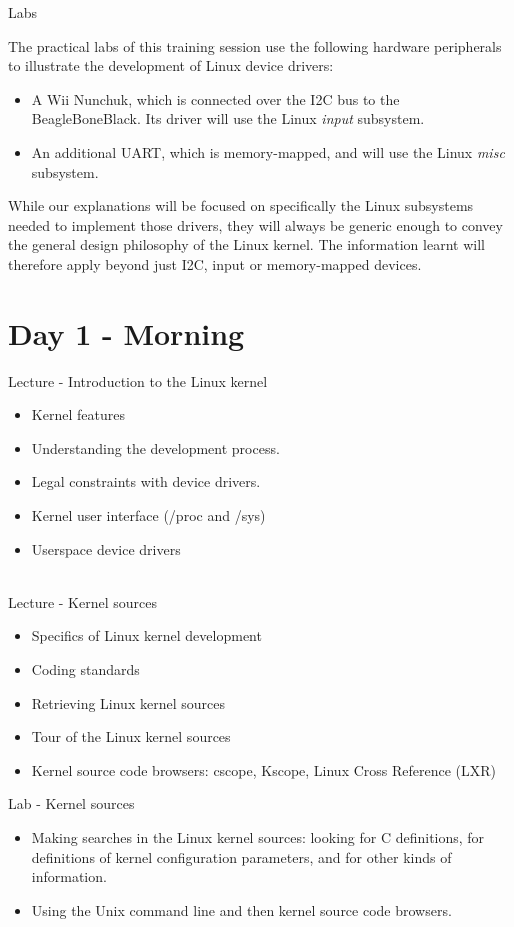 \documentclass[a4paper,12pt,obeyspaces,spaces,hyphens]{article}
\begin{document}
\feagendaonecolumn
{Labs}
{
  The practical labs of this training session use the following
  hardware peripherals to illustrate the development of Linux device
  drivers:

  \begin{itemize}
  \item A Wii Nunchuk, which is connected over the I2C bus to the
    BeagleBoneBlack. Its driver will use the Linux {\em input}
    subsystem.
  \item An additional UART, which is memory-mapped, and will use the
    Linux {\em misc} subsystem.
  \end{itemize}

  While our explanations will be focused on specifically the Linux
  subsystems needed to implement those drivers, they will always be
  generic enough to convey the general design philosophy of the Linux
  kernel. The information learnt will therefore apply beyond just
  I2C, input or memory-mapped devices.
}


\section{Day 1 - Morning}

\feagendaonecolumn
{Lecture - Introduction to the Linux kernel}
{
  \begin{itemize}
  \item Kernel features
  \item Understanding the development process.
  \item Legal constraints with device drivers.
  \item Kernel user interface (/proc and /sys)
  \item Userspace device drivers
  \end{itemize}
}
\\
\feagendatwocolumn
{Lecture - Kernel sources}
{
  \begin{itemize}
  \item Specifics of Linux kernel development
  \item Coding standards
  \item Retrieving Linux kernel sources
  \item Tour of the Linux kernel sources
  \item Kernel source code browsers: cscope, Kscope, Linux Cross
    Reference (LXR)
  \end{itemize}
}
{Lab - Kernel sources}
{
  \begin{itemize}
  \item Making searches in the Linux kernel sources: looking for C
    definitions, for definitions of kernel configuration parameters,
    and for other kinds of information.
  \item Using the Unix command line and then kernel source code
    browsers.
 \end{itemize}
}
\end{document}
